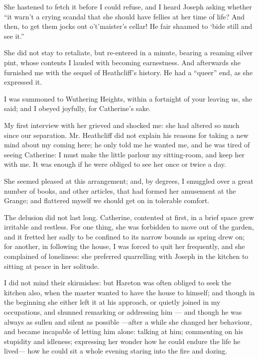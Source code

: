 \par She hastened to fetch it before I could refuse, and I heard Joseph asking whether “it warn't a crying scandal that she should have fellies at her time of life? And then, to get them jocks out o't'maister's cellar! He fair shaamed to ‘bide still and see it.”
\par She did not stay to retaliate, but re-entered in a minute, bearing a reaming silver pint, whose contents I lauded with becoming earnestness. And afterwards she furnished me with the sequel of Heathcliff's history. He had a “queer” end, as she expressed it.
\par 
\par I was summoned to Wuthering Heights, within a fortnight of your leaving us, she said; and I obeyed joyfully, for Catherine's sake.
\par My first interview with her grieved and shocked me: she had altered so much since our separation. Mr. Heathcliff did not explain his reasons for taking a new mind about my coming here; he only told me he wanted me, and he was tired of seeing Catherine: I must make the little parlour my sitting-room, and keep her with me. It was enough if he were obliged to see her once or twice a day.
\par She seemed pleased at this arrangement; and, by degrees, I smuggled over a great number of books, and other articles, that had formed her amusement at the Grange; and flattered myself we should get on in tolerable comfort.
\par The delusion did not last long. Catherine, contented at first, in a brief space grew irritable and restless. For one thing, she was forbidden to move out of the garden, and it fretted her sadly to be confined to its narrow bounds as spring drew on; for another, in following the house, I was forced to quit her frequently, and she complained of loneliness: she preferred quarrelling with Joseph in the kitchen to sitting at peace in her solitude.
\par I did not mind their skirmishes: but Hareton was often obliged to seek the kitchen also, when the master wanted to have the house to himself; and though in the beginning she either left it at his approach, or quietly joined in my occupations, and shunned remarking or addressing him — and though he was always as sullen and silent as possible —after a while she changed her behaviour, and became incapable of letting him alone: talking at him; commenting on his stupidity and idleness; expressing her wonder how he could endure the life he lived— how he could sit a whole evening staring into the fire and dozing.
